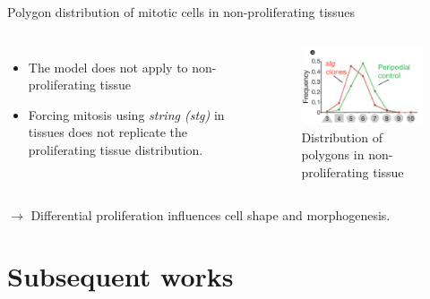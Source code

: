 \documentclass[aspectratio=169, 10pt]{beamer}
\begin{document}
\begin{frame}[fragile]{Polygon distribution of mitotic cells in non-proliferating tissues}
  \begin{columns}[onlytextwidth]
    \begin{itemize}
        \item The model does not apply to non-proliferating tissue
        \item Forcing mitosis using \textit{string (stg)} in tissues does not replicate the proliferating tissue distribution.
    \end{itemize}
    \begin{figure}
      \centering
      \includegraphics[width=\textwidth]{figures/fig3e.png}
      \caption{Distribution of polygons in non-proliferating tissue}
    \end{figure}
  \end{columns}
  $\rightarrow$ Differential proliferation influences cell shape and morphogenesis.
\end{frame}

\section{Subsequent works}
\end{document}

